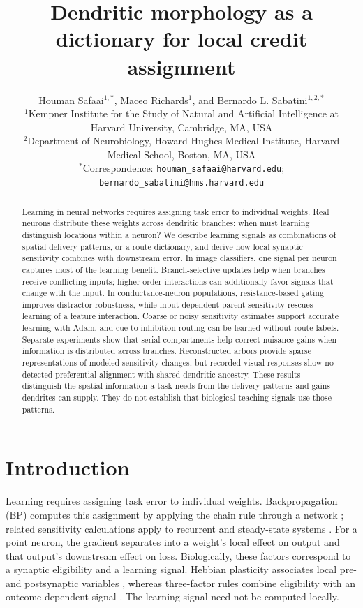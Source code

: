 \documentclass[11pt]{article}
\title{Dendritic morphology as a dictionary for local credit assignment}
\author{Houman Safaai$^{1,*}$, Maceo Richards$^{1}$, and Bernardo L. Sabatini$^{1,2,*}$\\[4pt]
\small $^{1}$Kempner Institute for the Study of Natural and Artificial Intelligence at Harvard University, Cambridge, MA, USA\\
\small $^{2}$Department of Neurobiology, Howard Hughes Medical Institute, Harvard Medical School, Boston, MA, USA\\
\small $^{*}$Correspondence: \texttt{houman\_safaai@harvard.edu}; \texttt{bernardo\_sabatini@hms.harvard.edu}}
\date{}
\begin{document}
\maketitle
\linenumbers

\begin{abstract}
Learning in neural networks requires assigning task error to individual weights. Real neurons distribute these weights across dendritic branches: when must learning distinguish locations within a neuron? We describe learning signals as combinations of spatial delivery patterns, or a route dictionary, and derive how local synaptic sensitivity combines with downstream error. In image classifiers, one signal per neuron captures most of the learning benefit. Branch-selective updates help when branches receive conflicting inputs; higher-order interactions can additionally favor signals that change with the input. In conductance-neuron populations, resistance-based gating improves distractor robustness, while input-dependent parent sensitivity rescues learning of a feature interaction. Coarse or noisy sensitivity estimates support accurate learning with Adam, and cue-to-inhibition routing can be learned without route labels. Separate experiments show that serial compartments help correct nuisance gains when information is distributed across branches. Reconstructed arbors provide sparse representations of modeled sensitivity changes, but recorded visual responses show no detected preferential alignment with shared dendritic ancestry. These results distinguish the spatial information a task needs from the delivery patterns and gains dendrites can supply. They do not establish that biological teaching signals use those patterns.
\end{abstract}

\section*{Introduction}

Learning requires assigning task error to individual weights. Backpropagation (BP) computes this assignment by applying the chain rule through a network \citep{rumelhart1986learning}; related sensitivity calculations apply to recurrent and steady-state systems \citep{almeida1987asynchronous,pineda1987recurrent}. For a point neuron, the gradient separates into a weight's local effect on output and that output's downstream effect on loss. Biologically, these factors correspond to a synaptic eligibility and a learning signal. Hebbian plasticity associates local pre- and postsynaptic variables \citep{hebb1949organization}, whereas three-factor rules combine eligibility with an outcome-dependent signal \citep{fremaux2016threefactor}. The learning signal need not be computed locally.
\end{document}
